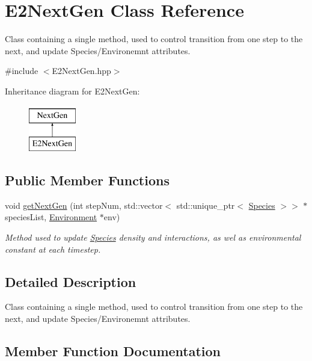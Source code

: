 \hypertarget{classE2NextGen}{}\section{E2\+Next\+Gen Class Reference}
\label{classE2NextGen}


Class containing a single method, used to control transition from one step to the next, and update Species/\+Environemnt attributes.  




{\ttfamily \#include $<$E2\+Next\+Gen.\+hpp$>$}

Inheritance diagram for E2\+Next\+Gen\+:\begin{figure}[H]
\begin{center}
\leavevmode
\includegraphics[height=2.000000cm]{classE2NextGen}
\end{center}
\end{figure}
\subsection*{Public Member Functions}
\begin{DoxyCompactItemize}
\item 
void \hyperlink{classE2NextGen_a2c5d35d9c8f9395cbd58d8fb837a08da}{get\+Next\+Gen} (int step\+Num, std\+::vector$<$ std\+::unique\+\_\+ptr$<$ \hyperlink{classSpecies}{Species} $>$$>$ $\ast$species\+List, \hyperlink{classEnvironment}{Environment} $\ast$env)
\begin{DoxyCompactList}\small\item\em Method used to update \hyperlink{classSpecies}{Species} density and interactions, as wel as environmental constant at each timestep. \end{DoxyCompactList}\end{DoxyCompactItemize}


\subsection{Detailed Description}
Class containing a single method, used to control transition from one step to the next, and update Species/\+Environemnt attributes. 

\subsection{Member Function Documentation}
\mbox{\label{classE2NextGen_a2c5d35d9c8f9395cbd58d8fb837a08da}} 
